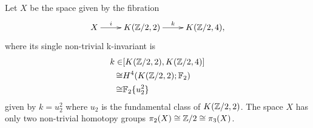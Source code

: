 Let $X$ be the space given by the fibration
$$\xymatrix{
X\ar[r]^-i &K(\Z/2,2)\ar[r]^-k &K(\Z/2,4),
}$$
where its single non-trivial k-invariant is
\begin{align*}
k \in& [K(\mathbb{Z}/2,2),K(\mathbb{Z}/2,4)]\\
\cong &H^4(K(\mathbb{Z}/2,2);\mathbb{F}_2)\\
\cong &\mathbb{F}_2\{u_2^2\}
\end{align*}
given by $k=u_2^2$ where $u_2$ is the fundamental class of $K(\mathbb{Z}/2,2)$. The space $X$ has only two non-trivial homotopy groups $\pi_2(X)\cong\mathbb{Z}/2\cong\pi_3(X)$.
\endinput